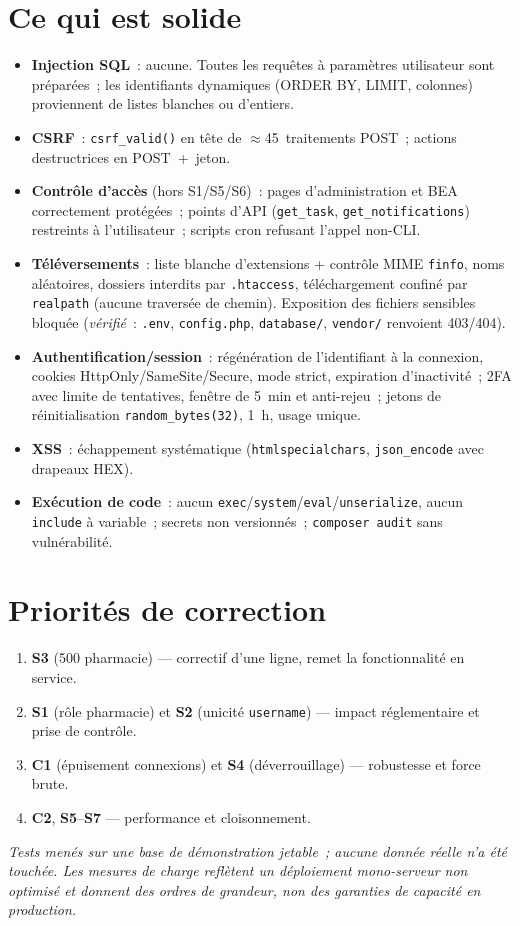 \documentclass[11pt,a4paper]{article}
\begin{document}
\section{Ce qui est solide}
\begin{itemize}[nosep,leftmargin=1.4em]
  \item \textcolor{ok}{\textbf{Injection SQL}}~: aucune. Toutes les requêtes à
    paramètres utilisateur sont préparées~; les identifiants dynamiques
    (ORDER BY, LIMIT, colonnes) proviennent de listes blanches ou d'entiers.
  \item \textcolor{ok}{\textbf{CSRF}}~: \texttt{csrf\_valid()} en tête de
    $\approx$45~traitements POST~; actions destructrices en POST~+~jeton.
  \item \textcolor{ok}{\textbf{Contrôle d'accès}} (hors S1/S5/S6)~: pages
    d'administration et BEA correctement protégées~; points d'API
    (\texttt{get\_task}, \texttt{get\_notifications}) restreints à
    l'utilisateur~; scripts cron refusant l'appel non-CLI.
  \item \textcolor{ok}{\textbf{Téléversements}}~: liste blanche d'extensions +
    contrôle MIME \texttt{finfo}, noms aléatoires, dossiers interdits par
    \texttt{.htaccess}, téléchargement confiné par \texttt{realpath}
    (aucune traversée de chemin). Exposition des fichiers sensibles bloquée
    (\emph{vérifié}~: \texttt{.env}, \texttt{config.php}, \texttt{database/},
    \texttt{vendor/} renvoient 403/404).
  \item \textcolor{ok}{\textbf{Authentification/session}}~: régénération de
    l'identifiant à la connexion, cookies HttpOnly/SameSite/Secure, mode
    strict, expiration d'inactivité~; 2FA avec limite de tentatives, fenêtre
    de 5~min et anti-rejeu~; jetons de réinitialisation
    \texttt{random\_bytes(32)}, 1~h, usage unique.
  \item \textcolor{ok}{\textbf{XSS}}~: échappement systématique
    (\texttt{htmlspecialchars}, \texttt{json\_encode} avec drapeaux HEX).
  \item \textcolor{ok}{\textbf{Exécution de code}}~: aucun
    \texttt{exec}/\texttt{system}/\texttt{eval}/\texttt{unserialize}, aucun
    \texttt{include} à variable~; secrets non versionnés~;
    \texttt{composer audit} sans vulnérabilité.
\end{itemize}

\section{Priorités de correction}
\begin{enumerate}[nosep,leftmargin=1.6em]
  \item \textbf{S3} (500 pharmacie) --- correctif d'une ligne, remet la
    fonctionnalité en service.
  \item \textbf{S1} (rôle pharmacie) et \textbf{S2} (unicité
    \texttt{username}) --- impact réglementaire et prise de contrôle.
  \item \textbf{C1} (épuisement connexions) et \textbf{S4} (déverrouillage) ---
    robustesse et force brute.
  \item \textbf{C2}, \textbf{S5}--\textbf{S7} --- performance et cloisonnement.
\end{enumerate}

\vfill
\footnotesize\textit{Tests menés sur une base de démonstration jetable~; aucune
donnée réelle n'a été touchée. Les mesures de charge reflètent un déploiement
mono-serveur non optimisé et donnent des ordres de grandeur, non des garanties
de capacité en production.}
\end{document}
